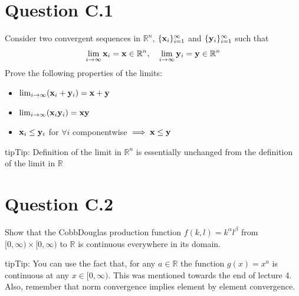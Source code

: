 \documentclass[letterpaper,10pt,english]{jupyterBook}
\begin{document}
\section{Question C.1}
\label{\detokenize{04.exercises:question-c-1}}
\sphinxAtStartPar
Consider two convergent sequences in \(\mathbb{R}^n\), \(\{{\bf x}_i\}_{i=1}^\infty\) and
\(\{{\bf y}_i\}_{i=1}^\infty\) such that
\begin{equation*}
\begin{split}
\lim_{i \to \infty} {\bf x}_i = {\bf x} \in \mathbb{R}^n, \quad
\lim_{i \to \infty} {\bf y}_i = {\bf y} \in \mathbb{R}^n
\end{split}
\end{equation*}
\sphinxAtStartPar
Prove the following properties of the limits:
\begin{itemize}
\item {} 
\sphinxAtStartPar
\(\lim_{i \to \infty} ({\bf x}_i+{\bf y}_i) = {\bf x} + {\bf y}\)

\item {} 
\sphinxAtStartPar
\(\lim_{i \to \infty} ({\bf x}_i{\bf y}_i) = {\bf x}{\bf y}\)

\item {} 
\sphinxAtStartPar
\({\bf x}_i \le {\bf y}_i\) for \(\forall i\) component\sphinxhyphen{}wise \(\implies {\bf x} \le {\bf y}\)

\end{itemize}

\begin{sphinxadmonition}{tip}{Tip:}
\sphinxAtStartPar
Definition of the limit in \(\mathbb{R}^n\) is essentially unchanged from the definition of the limit in \(\mathbb{R}\)
\end{sphinxadmonition}


\section{Question C.2}
\label{\detokenize{04.exercises:question-c-2}}
\sphinxAtStartPar
Show that the Cobb\sphinxhyphen{}Douglas production function
\(f(k,l) = k^\alpha l^\beta\) from \([0,\infty) \times [0,\infty)\) to \(\mathbb{R}\) is continuous everywhere in its domain.

\begin{sphinxadmonition}{tip}{Tip:}
\sphinxAtStartPar
You can use the fact that, for any \(a \in \mathbb{R}\) the function \(g(x) = x^a\) is continuous at any \(x \in [0,\infty)\). This was mentioned towards the end of lecture 4.
Also, remember that norm convergence implies element by element convergence.
\end{sphinxadmonition}
\end{document}
